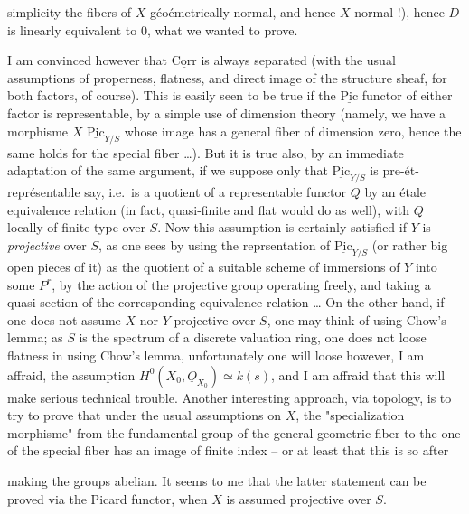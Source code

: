 \documentclass[11pt,a4paper]{article}
\begin{document}
simplicity the fibers of $X$ géoémetrically normal, and hence $X$ normal !), hence $D$ is linearly equivalent to $0$, what we wanted to prove.

I am convinced however that $\underline{\mathrm{Corr}}$ is always separated (with the usual assumptions of properness, flatness, and direct image of the structure sheaf, for both factors, of course). This is easily seen to be true if the $\underline{\mathrm{Pic}}$ functor of either factor is representable, by a simple use of dimension theory (namely, we have a morphisme $X$ \supplied{$\to$} $\underline{\mathrm{Pic}}_{Y/S}$ whose image has a general fiber of dimension zero, hence the same holds for the special fiber …). But it is true also, by an immediate adaptation of the same argument, if we suppose only that $\underline{\mathrm{Pic}}_{Y/S}$ is pre-ét-représentable say, i.e.\ is a quotient of a representable functor $Q$ by an étale equivalence relation (in fact, quasi-finite and flat would do as well), with $Q$ locally of finite type over $S$. Now this assumption is certainly satisfied if $Y$ is \emph{projective} over $S$, as one sees by using the reprsentation of $\underline{\mathrm{Pic}}_{Y/S}$ (or rather big open pieces of it) as the quotient of a suitable scheme of immersions of $Y$ into some $P^r$, by the action of the projective group operating freely, and taking a quasi-section of the corresponding equivalence relation … On the other hand, if one does not assume $X$ nor $Y$ projective over $S$, one may think of using Chow's lemma; as $S$ is the spectrum of a discrete valuation ring, one does not loose flatness in using Chow's lemma, unfortunately one will loose however, I am affraid, the assumption $H^0(X_0, \underline{O}_{X_0}) \simeq k(s)$, and I am affraid that this will make serious technical trouble. Another interesting approach, via topology, is to try to prove that under the usual assumptions on $X$, the "specialization morphisme" from the fundamental group of the general geometric fiber to the one of the special fiber has an image of finite index -- or at least that this is so after

making the groups abelian. It seems to me that the latter statement can be proved via the Picard functor, when $X$ is assumed projective over $S$.
\end{document}
